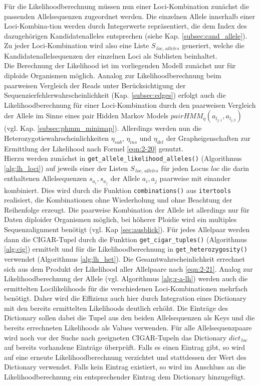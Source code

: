 Für die Likelihoodberechnung müssen nun einer Loci-Kombination zunächst die passenden Allelsequenzen zugeordnet werden. Die einzelnen Allele innerhalb einer Loci-Kombina-tion werden durch Integerwerte repräsentiert, die dem Index des dazugehörigen Kandidatenalleles entsprechen (siehe Kap. \ref{subsec:cand_allele}). Zu jeder Loci-Kombination wird also eine Liste $ S_{\,loc,\, alleles} $ generiert, welche die Kandidatenallelsequenzen der einzelnen Loci als Sublisten beinhaltet.\\

Die Berechnung der Likelihood ist im vorliegenden Modell zunächst nur für diploide Organismen möglich. Aanalog zur Likelihoodberechnung beim paarweisen Vergleich der Reads unter Berücksichtigung der Sequenzierfehlerwahrscheinlichkeit (Kap. \ref{subsec:edges}) erfolgt auch die Likelihoodberechnung für einer Loci-Kombination durch den paarweisen Vergleich der Allele im Sinne eines pair Hidden Markov Models $ pairHMM_{\eta}(a_{l_{j,1}}, a_{l_{j,2}}) $ (vgl. Kap. \ref{subsec:phmm_minimap}). Allerdings werden nun die Heterozygotiewahrscheinlichkeiten $\eta_{sub}$, $\eta_{ins}$ und $\eta_{del}$ der Grapheigenschaften zur Ermittlung der Likelihood nach Formel \eqref{eqn:2-20} genutzt.  \\

Hierzu werden zunächst in \lstinline|get_allele_likelihood_alleles()| (Algorithmus \ref{alg:lh_loci}) auf jeweils einer der Listen $S_{\,loc,\, alleles}$ für jeden Locus $loc$ die darin enthaltenen Allelsequenzen $s_{a_{i}}, s_{a_{j}}$  der Allele ${a_{i}, a_{j}}$ paarweise mit einander kombiniert. Dies wird durch die Funktion \lstinline|combinations()| aus  \lstinline|itertools| realisiert, die Kombinationen ohne Wiederholung und ohne Beachtung der Reihenfolge erzeugt. Die paarweise Kombination der Allele ist allerdings nur für Daten diploider Organismen möglich, bei höherer Ploidie wird ein multiples Sequenzalignment benötigt (vgl. Kap \ref{sec:ausblick}). Für jedes Allelpaar werden dann die CIGAR-Tupel durch die Funktion \lstinline|get_cigar_tuples()| (Algorithmus \ref{alg:cig}) ermittelt und für die Likelihoodberechnung in \lstinline|get_heterozygosity()| verwendet (Algorithmus \ref{alg:lh_het}). Die Gesamtwahrscheinlichkeit errechnet sich aus dem Produkt der Likelihood aller Allelpaare nach \ref{eqn:2-21}. Analog zur Likelihoodberechnung der Allele (vgl. Algorithmus \ref{alg:r-a-lh}) werden auch die ermittelten Locilikelihoods für die verschiedenen Loci-Kombinationen mehrfach benötigt. Daher wird die Effizienz auch hier durch Integration eines Dictionary mit den bereits ermittelten Likelihoods deutlich erhöht. Die Einträge des Dictionary sollen dabei die Tupel aus den beiden Allelsequenzen als Keys und die bereits errechneten Likelihoods als Values verwenden. Für alle Allelsequenzpaare wird noch vor der Suche nach geeigneten CIGAR-Tupeln das Dictionary $ dict_{\,loc} $ auf bereits vorhandene Einträge überprüft.  Falls es einen Eintrag gibt, so wird auf eine erneute Likelihoodberechnung verzichtet und stattdessen der Wert des Dictionary verwendet. Falls kein Eintrag existiert, so wird im Anschluss an die Likelihoodberechnung ein entsprechender Eintrag dem Dictionary hinzugefügt.

